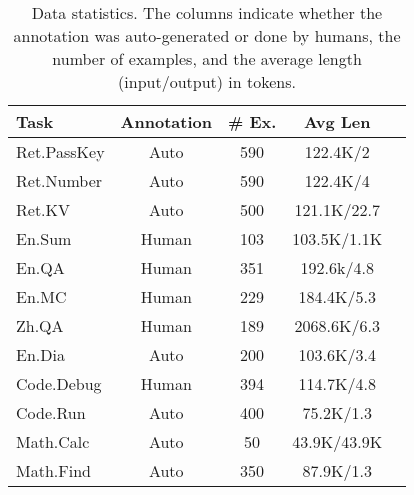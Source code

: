 \begin{table}[!t]
    \footnotesize
    \centering
    \begin{tabular}{l|cccc}
        \toprule
        \textbf{Task}  & \textbf{Annotation}  & \textbf{\# Ex.} & \textbf{Avg Len} \\
        \midrule
        Ret.PassKey    & Auto & 590 & 122.4K/2\\
        Ret.Number     & Auto & 590 & 122.4K/4\\
        Ret.KV         & Auto & 500 & 121.1K/22.7\\
        \midrule
        En.Sum      & Human & 103 & 103.5K/1.1K\\
        En.QA       & Human & 351 & 192.6k/4.8\\
        En.MC       & Human & 229 & 184.4K/5.3\\
        Zh.QA       & Human & 189 & 2068.6K/6.3 \\
        En.Dia      & Auto & 200 & 103.6K/3.4 \\
        \midrule
        Code.Debug  & Human & 394 & 114.7K/4.8\\
        Code.Run    & Auto & 400 & 75.2K/1.3 \\
        \midrule
        Math.Calc   & Auto & 50 & 43.9K/43.9K \\
        Math.Find   & Auto & 350 & 87.9K/1.3 \\
        \bottomrule
    \end{tabular}
    \caption{Data statistics. The columns indicate whether the annotation was auto-generated or done by humans, the number of examples, and the average length (input/output) in tokens.}
    \label{tab:data-statistics}
\end{table}
